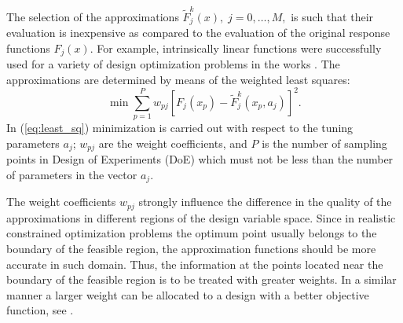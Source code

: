 \documentclass[runningheads,a4paper]{llncs}
\begin{document}
The selection of the approximations $\widetilde{F}^k_j(x),\; j=0, \dots ,M,$ is such that their evaluation is inexpensive as compared to the evaluation of the original response functions $F_j(x)$. For example, intrinsically linear functions were successfully used for a variety of design optimization problems in the works \cite{ToropovFilatov1993,KeulenToropov1997}. The approximations are determined by means of the weighted least squares:
\begin{equation}\label{eq:least_sq}
\min \sum_{p=1}^P{w_{pj}\left[ F_j(x_p)- \widetilde{F}^k_j(x_p,a_j) \right]^2}.
\end{equation}
In (\ref{eq:least_sq}) minimization is carried out with respect to the tuning parameters $a_j$; $w_{pj}$ are the weight coefficients, and $P$ is the number of sampling points in Design of Experiments (DoE) which must not be less than the number of parameters in the vector $a_j$.

The weight coefficients $w_{pj}$ strongly influence the difference in the quality of the approximations in different regions of the design variable space. Since in realistic constrained optimization problems the optimum point usually belongs to the boundary of the feasible region, the approximation functions should be more accurate in such domain. Thus, the information at the points located near the boundary of the feasible region is to be treated with greater weights. In a similar manner a larger weight can be allocated to a design with a better objective function, see \cite{ToropovFilatov1993,KeulenToropov1997}.
\end{document}
